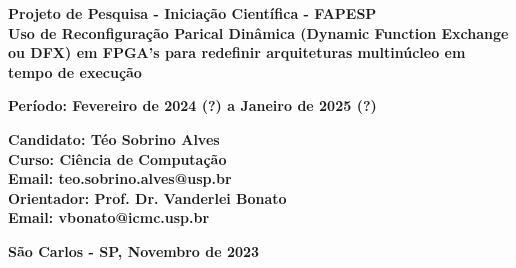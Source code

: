 \begin{center}
    
        \vspace*{5ex}
        
        \textbf{\Large Projeto de Pesquisa - Iniciação Científica - FAPESP}\\
        
        \vspace*{12ex}
        \textbf{\Large Uso de Reconfiguração Parical Dinâmica 
                (Dynamic Function Exchange ou DFX) em FPGA's para redefinir 
                arquiteturas multinúcleo em tempo de execução}
        
        \vspace*{12ex}
        
        \normalfont\sffamily
        
        \textbf{\large Período: Fevereiro de 2024 (?) a Janeiro de 2025 (?)} \\
        \vspace*{5ex}
        
        \end{center}
        
        \begin{flushleft}
            
        \textbf{\large Candidato: Téo Sobrino Alves \\
                        Curso: Ciência de Computação\\
                        Email: teo.sobrino.alves@usp.br
                        } \\
        
        \vspace*{2ex}
        \textbf{\large Orientador: Prof. Dr. Vanderlei Bonato\\
                        Email: vbonato@icmc.usp.br} \\
        
        \end{flushleft}
        \vspace*{5ex}
        
        \begin{center}
        \textbf{\large São Carlos - SP, Novembro de 2023} 
        \end{center}